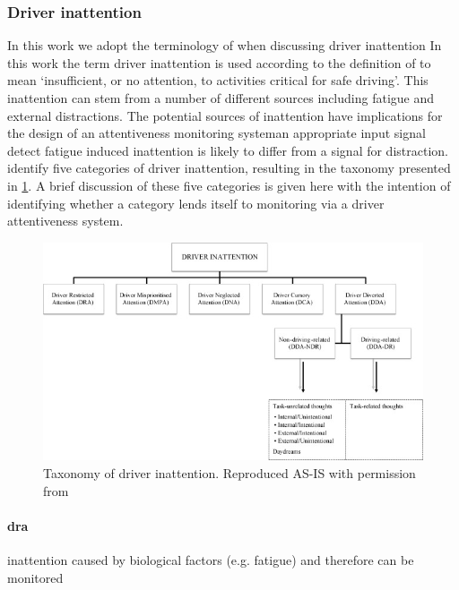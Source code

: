 \documentclass[11pt, parskip=half*,twoside=false]{scrbook}
\begin{document}
\subsubsection{Driver inattention}
In this work we adopt the terminology of \citet{reganDriverDistractionDriver2011} when discussing driver inattention
In this work the term driver inattention is used according to the definition of \citet{reganDriverDistractionDriver2011} to mean `insufficient, or no attention, to activities critical for safe driving'. This inattention can stem from a number of different sources including fatigue and external distractions. The potential sources of inattention have implications for the design of an attentiveness monitoring system\textemdash an appropriate input signal detect fatigue induced inattention is likely to differ from a signal for distraction.  \citet{reganDriverDistractionDriver2011} identify five categories of driver inattention, resulting in the taxonomy presented in \cref{fig:taxonomy_inattention}. A brief discussion of these five categories is given here with the intention of identifying whether a category lends itself to monitoring via a driver attentiveness system. 

\begin{figure} 
	\centering
	\includegraphics[width=\textwidth]{driver_inattention_taxonomy} 
	\caption{Taxonomy of driver inattention. Reproduced AS-IS with permission from \citep{reganDriverDistractionDriver2011}}
	\label{fig:taxonomy_inattention}
\end{figure}


\paragraph{\gls{dra}} inattention caused by biological factors (e.g. fatigue) and therefore can be monitored
\end{document}
